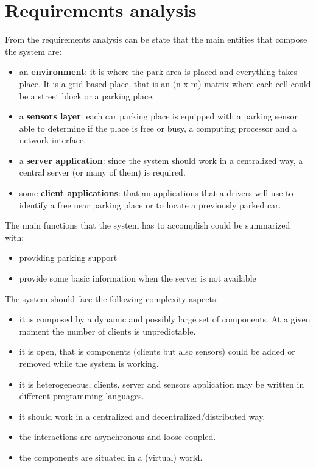 \documentclass[11pt]{article}
\begin{document}
\section{Requirements analysis}
From the requirements analysis can be state that the main entities that compose the system are:
\begin{itemize}
\item an \textbf{environment}: it is where the park area is placed and everything takes place. It is a grid-based place, that is an (n x m) matrix where each cell could be a street block or a parking place.
\item a \textbf{sensors layer}: each car parking place is equipped with a parking sensor able to determine if the place is free or busy, a computing processor and a network interface.
\item a \textbf{server application}: since the system should work in a centralized way, a central server (or many of them) is required.
\item some \textbf{client applications}: that an applications that a drivers will use to identify a free near parking place or to locate a previously parked car.
\end{itemize}
The main functions that the system has to accomplish could be summarized with:
\begin{itemize}
\item providing parking support
\item provide some basic information when the server is not available
\end{itemize}

The system should face the following complexity aspects:
\begin{itemize}
\item it is composed by a dynamic and possibly large set of components. At a given moment the number of clients is unpredictable.
\item it is open, that is components (clients but also sensors) could be added or removed while the system is working.
\item it is heterogeneous, clients, server and sensors application may be written in different programming languages.
\item it should work in a centralized and decentralized/distributed way.
\item the interactions are asynchronous and loose coupled.
\item the components are situated in a (virtual) world.
\end{itemize}
\end{document}
